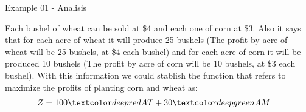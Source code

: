 \begin{frame}{Example 01 - Analisis}

Each bushel of wheat can be sold at \$4 and each one of corn at \$3. Also it says
that for each acre of wheat  it will produce 25 bushels (The profit by acre of wheat will
be 25 bushels, at \$4 each bushel) and for each acre of corn it will be produced 10
bushels (The profit by acre of corn will be 10  bushels, at \$3 each bushel). With this
information we could stablish the function that refers to maximize the profits of planting
corn and wheat as:
\begin{align*}
    Z &= 100\colora{AT} + 30\colorb{AM}
\end{align*}


\end{frame}
